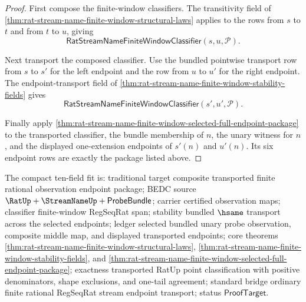 \begin{proof}
First compose the finite-window classifiers. The transitivity field of
\autoref{thm:rat-stream-name-finite-window-structural-laws} applies to the
rows from $s$ to $t$ and from $t$ to $u$, giving
$$
\mathsf{RatStreamNameFiniteWindowClassifier}(s,u,\mathcal{P}).
$$

Next transport the composed classifier. Use the bundled pointwise transport
row from $s$ to $s'$ for the left endpoint and the row from $u$ to $u'$ for
the right endpoint. The endpoint-transport field of
\autoref{thm:rat-stream-name-finite-window-stability-fields} gives
$$
\mathsf{RatStreamNameFiniteWindowClassifier}(s',u',\mathcal{P}).
$$

Finally apply
\autoref{thm:rat-stream-name-finite-window-selected-full-endpoint-package} to
the transported classifier, the bundle membership of $n$, the unary witness
for $n$, and the displayed one-extension endpoints of $s'(n)$ and $u'(n)$.
Its six endpoint rows are exactly the package listed above.
\end{proof}

The compact ten-field fit is: traditional target composite transported finite
rational observation endpoint package; BEDC source
$\RatUp+\StreamNameUp+\mathsf{ProbeBundle}$; carrier certified observation
maps; classifier finite-window RegSeqRat span; stability bundled $\hsame$
transport across the selected endpoints; ledger selected bundled unary probe
observation, composite middle map, and displayed transported endpoints;
core theorems \autoref{thm:rat-stream-name-finite-window-structural-laws},
\autoref{thm:rat-stream-name-finite-window-stability-fields}, and
\autoref{thm:rat-stream-name-finite-window-selected-full-endpoint-package};
exactness transported RatUp point classification with positive denominators,
shape exclusions, and one-tail agreement; standard bridge ordinary finite
rational RegSeqRat stream endpoint transport; status $\mathsf{ProofTarget}$.

